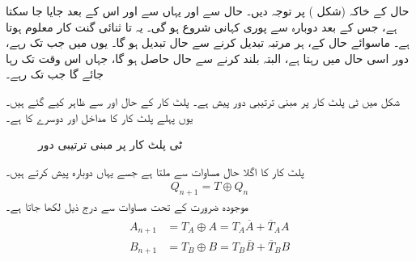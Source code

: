  حال  کے خاکہ (شکل ) پر توجہ دیں۔ حال  سے  اور یہاں سے  اور اس کے بعد  جایا جا سکتا ہے، جس کے بعد دوبارہ  سے پوری کہانی شروع ہو گی۔ یہ  تا  ثنائی گنت کار معلوم ہوتا ہے۔ ماسوائے حال  کے، ہر مرتبہ  تبدیل کرنے سے حال تبدیل ہو گا۔ یوں  میں جب تک  رہے، دور اسی حال میں رہتا ہے، البتہ  بلند کرنے سے  حال حاصل ہو گا، جہاں اس وقت تک رہا جائے گا جب تک  رہے۔



شکل  میں ٹی پلٹ کار پر مبنی ترتیبی دور پیش ہے۔ پلٹ کار کے حال  اور  سے ظاہر کیے گئے ہیں۔یوں پہلے پلٹ کار کا مداخل  اور دوسرے کا  ہے۔
\begin{figure}
\centering
{}
\caption{ٹی پلٹ کار پر مبنی ترتیبی دور}
\label{شکل_ترتیبی_ٹی_پلٹ_ترتیبی_مثال}
\end{figure}

پلٹ کار کا اگلا حال مساوات  سے ملتا ہے جسے یہاں دوبارہ پیش کرتے ہیں۔
\begin{align*}
Q_{n+1}=T\oplus Q_n
\end{align*}
موجودہ ضرورت کے تحت مساوات سے درج ذیل لکھا جاتا ہے۔
\begin{gather}
\begin{aligned}\label{مساوات_ترتیبی_ٹی_مثال_حال}
A_{n+1}&=T_A\oplus A=T_A \overline{A}+\overline{T}_AA\\
B_{n+1}&=T_B\oplus B=T_B\overline{B}+\overline{T}_BB
\end{aligned}
\end{gather}

